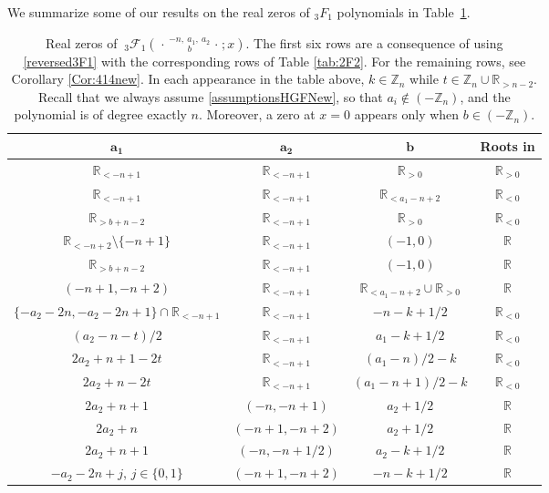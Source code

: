 \documentclass[reqno,11pt]{amsart}
\theoremstyle{remark}
\newcommand{\R}{\mathbb{R}}
\newcommand{\Z}{\mathbb{Z}}
\newcommand{\rr}{\mathbb{R}}
\newcommand*\pFq[5]{%
 {\ }_{#1}{\mathcal F}_{#2}{\left(\genfrac..{0pt}{}{#3}{#4};#5\right)}%
}
\begin{document}
We summarize some of our results on the real zeros of ${}_3 F_1$ polynomials in Table~\ref{tab:3F1}.  
 

\begin{table}[ht]
    \centering
\begin{tabular}{|c|c|c|c|}
\hline $\mathbf{a_1}$ & $\mathbf{a_2}$& $\mathbf{b}$ & \textbf{Roots in} \\
\hline $ \R_{<-n+1}$ & $\R_{<-n+1}$& $ \R_{> 0}$ &  $\R_{> 0}$ \\
\hline  $ \R_{<-n+1}$ & $ \R_{<-n+1}$ & $  \R_{< a_1-n+2} $&  $\R_{< 0}$   \\
\hline $\R_{> b+n-2}$ & $\R_{<-n+1}$& $   \R_{>0}$& $\R_{<0}$  \\
\hline $\R_{<-n+2}\setminus \{- n+1\}$ & $\R_{<-n+1}$ & $(-1,0)  $&  $\mathbb{R}$\\
\hline $\R_{>b+n-2}$ & $\R_{<-n+1}$ &  $ (-1,0) $& $\mathbb{R}$  \\
\hline $(-n+1,-n+2)$ & $\R_{<-n+1}$ & $\R_{<a_1-n+2} \cup \R_{>0}$ & $\R$  \\  \hline 
\hline $\{-a_2-2n, -a_2-2n+1\} \cap \R_{<-n+1}$  & $\R_{<-n+1}$ & $-n -k +1/2$ 
& $\mathbb{R}_{< 0}$  \\
\hline $(a_2-n-t)/2$  & $\R_{<-n+1}$ & $a_1 - k +1/2$ 
& $\mathbb{R}_{< 0}$  \\
\hline $2a_2+n+1-2t$   & $ \R_{<-n+1}$ & $(a_1-n)/2-k$ 
& $\mathbb{R}_{< 0}$  \\
\hline $2a_2+n -2t$   & $ \R_{<-n+1}$ & $ (a_1-n+1)/2-k$ 
& $\mathbb{R}_{< 0}$  \\
\hline $ 2a_2+n +1 $  & $(-n ,-n+1) $  & $a_2+1/2 $ 
& $\mathbb{R} $  \\
\hline $ 2a_2+n  $  & $(-n+1 ,-n+2)$  & $a_2+1/2  $ 
& $\mathbb{R} $  \\
\hline $2a_2+n +1  $  & $(-n ,-n+1/2)$  & $a_2 - k +1/2$ 
& $\mathbb{R} $  \\
 \hline $-a_2-2n+j$, $j\in \{0,1\}$  & $(-n+1, -n+2)  $   & $ -n -k +1/2$ 
 & $\mathbb{R} $  \\
\hline
\end{tabular}
\vspace{2mm}
\caption{Real zeros of $\pFq{3}{1}{-n, \ a_1, \  a_2}{   b}{x}$. 
The first six rows are a consequence of using \eqref{reversed3F1} with the corresponding rows of Table \ref{tab:2F2}.  For the remaining rows, see Corollary \ref{Cor:414new}. In each appearance in the table above, $k\in \mathbb Z_n $ while $t\in \mathbb Z_n \cup  \rr_{>n-2}$. Recall that we always assume \eqref{assumptionsHGFNew}, so that $  a_i \notin (-\Z_n)$, and the polynomial is of degree exactly $n$. Moreover, a zero at $x=0$ appears only when $b \in (-\Z_n)$.   }
    \label{tab:3F1}
\end{table}
\end{document}

